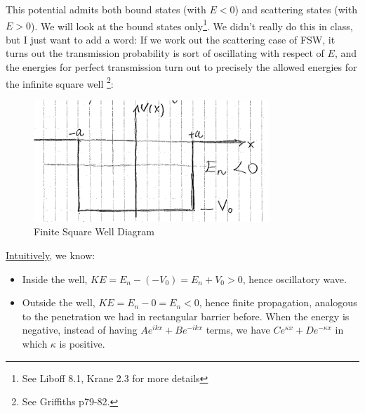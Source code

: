\documentclass{school-22.101-notes}
\begin{document}
\label{finite-square-well}
This potential admits both bound states (with $E < 0$) and scattering states (with $E>0$). We will look at the bound states only\footnote{See Liboff 8.1, Krane 2.3 for more details}. We didn't really do this in class, but I just want to add a word: If we work out the scattering case of FSW, it turns out the transmission probability is sort of oscillating with respect of $E$, and the energies for perfect transmission turn out to precisely the allowed energies for the infinite square well \footnote{See Griffiths p79-82.}:
\begin{figure}[ht]
    \centering
    \includegraphics[width=3.5in]{images/qm/FSW.png}
    \caption{Finite Square Well Diagram}
\end{figure}

\uline{Intuitively}, we know:
\begin{itemize}
\item Inside the well, $KE = E_n - (-V_0) = E_n + V_0 > 0$, hence oscillatory wave. 
\item Outside the well, $KE = E_n - 0 = E_n <0$, hence finite propagation, analogous to the penetration we had in rectangular barrier before. When the energy is negative, instead of having $A e^{ikx} + B e^{-ikx}$ terms, we have $C e^{\kappa x} + D e^{-\kappa x}$ in which $\kappa$ is positive. 
\end{itemize}
\end{document}
